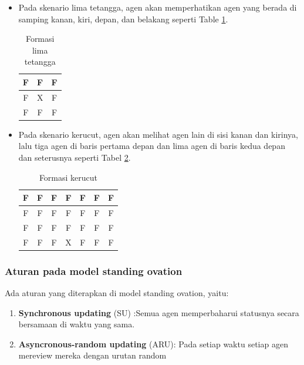 \begin{itemize}
	\item Pada skenario lima tetangga, agen akan memperhatikan agen yang berada di samping kanan, kiri, depan, dan belakang seperti Table \ref{tbl:formasi_sop}.

	\begin{table}[H]
		\centering
		\begin{tabular}{|c|c|c|}
			\hline
			F & \cellcolor{gray!30}F & F \\
			\hline
			\cellcolor{gray!30}F & \cellcolor{gray!50}X & \cellcolor{gray!30}F \\
			\hline
			F & \cellcolor{gray!30}F & F \\
			\hline
		\end{tabular}
		\caption{Formasi lima tetangga}
		\label{tbl:formasi_sop}
	\end{table}

	\item Pada skenario kerucut, agen akan melihat agen lain di sisi kanan dan kirinya, lalu tiga agen di baris pertama depan dan lima agen di baris kedua depan dan seterusnya seperti Tabel \ref{tbl:formasi_kerucut}.

	\begin{table}[H]
		\centering
		\begin{tabular}{|c|c|c|c|c|c|c|}
			\hline
			\cellcolor{gray!30}F & \cellcolor{gray!30}F & \cellcolor{gray!30}F & \cellcolor{gray!30}F & \cellcolor{gray!30}F & \cellcolor{gray!30}F & \cellcolor{gray!30}F \\
			\hline
			F & \cellcolor{gray!30}F & \cellcolor{gray!30}F & \cellcolor{gray!30}F & \cellcolor{gray!30}F & \cellcolor{gray!30}F & F \\
			\hline
			F & F & \cellcolor{gray!30}F & \cellcolor{gray!30}F & \cellcolor{gray!30}F & F & F \\
			\hline
			F & F & \cellcolor{gray!30}F & \cellcolor{gray!50}X & \cellcolor{gray!30}F & F & F \\
			\hline
		\end{tabular}
		\caption{Formasi kerucut}
		\label{tbl:formasi_kerucut}
	\end{table}
\end{itemize}

\subsubsection{Aturan pada model standing ovation}
Ada aturan yang diterapkan di model standing ovation, yaitu:
\begin{enumerate}
	\item \textbf{Synchronous updating} (SU) :Semua agen memperbaharui statusnya secara bersamaan di waktu yang sama.

	\item \textbf{Asyncronous-random updating} (ARU): Pada setiap waktu setiap agen mereview mereka dengan urutan random
\end{enumerate}

